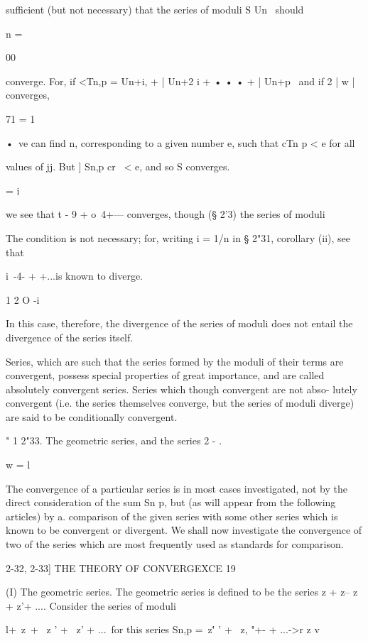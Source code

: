 sufficient (but not necessary) that the series of moduli S Un \ should

n = \

00

converge. For, if <Tn,p = Un+i, + | Un+2 i + • • • + | Un+p \ and if
2 | w | converges,

71 = 1

•\ ve can find n, corresponding to a given number e, such that cTn p <
e for all

values of jj. But ] Sn,p cr \ < e, and so S converges.

  = i



we see that t - 9 + o~4+--- converges, though (§ 2'3) the series of
moduli



The condition is not necessary; for, writing i = 1/n in § 2"31,
corollary (ii), see that

i\ -4- + +...is known to diverge.

1 2 O -i

In this case, therefore, the divergence of the series of moduli does
not entail the divergence of the series itself.

Series, which are such that the series formed by the moduli of their
terms are convergent, possess special properties of great importance,
and are called absolutely convergent series. Series which though
convergent are not abso- lutely convergent (i.e. the series themselves
converge, but the series of moduli diverge) are said to be
conditionally convergent.

" 1 2"33. The geometric series, and the series 2 - .

w = l

The convergence of a particular series is in most cases investigated,
not by the direct consideration of the sum Sn p, but (as will appear
from the following articles) by a. comparison of the given series with
some other series which is known to be convergent or divergent. We
shall now investigate the convergence of two of the series which are
most frequently used as standards for comparison.



2-32, 2-33] THE THEORY OF CONVERGEXCE 19

(I) The geometric series. The geometric series is defined to be the
series z + z-- z + z'+ .... Consider the series of moduli

l+\ z\ + \ z ' + \ z' + ...\ for this series Sn,p =\ z\'' ' + \ z, "+-
+ ...->r z v

